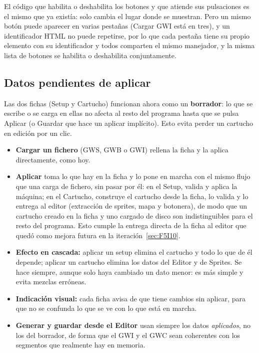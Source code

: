 El código que habilita o deshabilita los botones y que atiende sus pulsaciones es el mismo que ya existía: solo cambia el lugar donde se muestran. Pero un mismo botón puede aparecer en varias pestañas (Cargar GWI está en tres), y un identificador HTML no puede repetirse, por lo que cada pestaña tiene su propio elemento con su identificador y todos comparten el mismo manejador, y la misma lista de botones se habilita o deshabilita conjuntamente.

\subsection{Datos pendientes de aplicar}
\label{sec:F5I12Aplicar}

Las dos fichas (Setup y Cartucho) funcionan ahora como un \textbf{borrador}: lo que se escribe o se carga en ellas no afecta al resto del programa hasta que se pulsa Aplicar (o Guardar que hace un aplicar implícito). Esto evita perder un cartucho en edición por un clic.

\begin{itemize}
	\item \textbf{Cargar un fichero} (GWS, GWB o GWI) rellena la ficha y la aplica directamente, como hoy.
	\item \textbf{Aplicar} toma lo que hay en la ficha y lo pone en marcha con el mismo flujo que una carga de fichero, sin pasar por él: en el Setup, valida y aplica la máquina; en el Cartucho, construye el cartucho desde la ficha, lo valida y lo entrega al editor (extracción de sprites, mapa y botonera), de modo que un cartucho creado en la ficha y uno cargado de disco son indistinguibles para el resto del programa. Esto cumple la entrega directa de la ficha al editor que quedó como mejora futura en la iteración~\ref{sec:F5I10}.
	\item \textbf{Efecto en cascada:} aplicar un setup elimina el cartucho y todo lo que de él depende; aplicar un cartucho elimina los datos del Editor y de Sprites. Se hace siempre, aunque solo haya cambiado un dato menor: es más simple y evita mezclas erróneas.
	\item \textbf{Indicación visual:} cada ficha avisa de que tiene cambios sin aplicar, para que no se confunda lo que se ve con lo que está en marcha.
	\item \textbf{Generar y guardar desde el Editor} usan siempre los datos \emph{aplicados}, no los del borrador, de forma que el GWI y el GWC sean coherentes con los segmentos que realmente hay en memoria.
\end{itemize}


